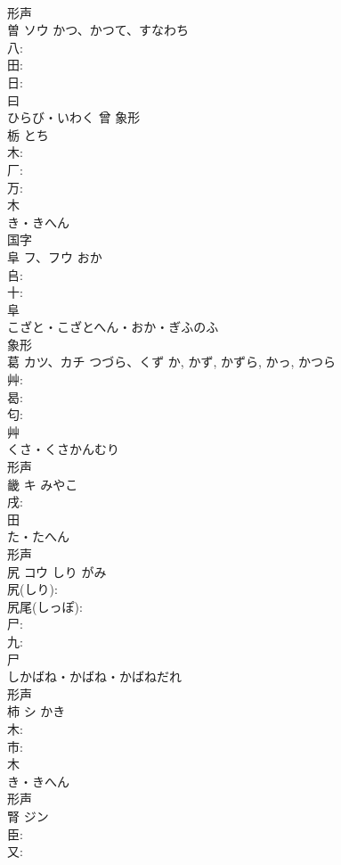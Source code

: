 \documentclass[8pt]{extreport}
\begin{document}
\begin{CJK}{UTF8}{min}
\\	形声 
\\	曽	ソウ	かつ、かつて、すなわち		
\\	八: 
\\	田: 
\\	日: 
\\	曰	
\\	ひらび・いわく	曾	象形 
\\	栃		とち		
\\	木: 
\\	厂: 
\\	万: 
\\	木	
\\	き・きへん	
\\	国字 
\\	阜	フ、フウ		おか	
\\	𠂤: 
\\	十: 
\\	阜	
\\	こざと・こざとへん・おか・ぎふのふ	
\\	象形 
\\	葛	カツ、カチ	つづら、くず	か, かず, かずら, かっ, かつら	
\\	艸: 
\\	曷: 
\\	匂: 
\\	艸	
\\	くさ・くさかんむり	
\\	形声 
\\	畿	キ	みやこ		
\\	戌: 
\\	田	
\\	た・たへん	
\\	形声 
\\	尻	コウ	しり	がみ	
\\	尻(しり): 
\\	尻尾(しっぽ): 
\\	尸: 
\\	九: 
\\	尸	
\\	しかばね・かばね・かばねだれ	
\\	形声 
\\	柿	シ	かき		
\\	木: 
\\	市: 
\\	木	
\\	き・きへん	
\\	形声 
\\	腎	ジン			
\\	臣: 
\\	又: 

\end{CJK}
\end{document}
